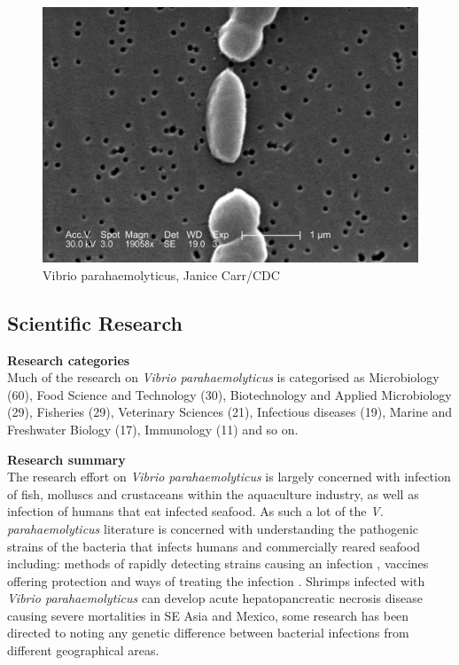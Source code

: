 \documentclass[]{book}
\theoremstyle{definition}
\theoremstyle{definition}
\theoremstyle{definition}
\theoremstyle{remark}
\begin{document}
\begin{figure}

{\centering \includegraphics[width=39.38in]{images_species/Vibrio_parahaemolyticus_01} 

}

\caption{Vibrio parahaemolyticus, Janice Carr/CDC}\label{fig:unnamed-chunk-10}
\end{figure}

\hypertarget{scientific-research-9}{%
\subsection{Scientific Research}\label{scientific-research-9}}

\textbf{Research categories}\\
Much of the research on \emph{Vibrio parahaemolyticus} is categorised as
Microbiology (60), Food Science and Technology (30), Biotechnology and
Applied Microbiology (29), Fisheries (29), Veterinary Sciences (21),
Infectious diseases (19), Marine and Freshwater Biology (17), Immunology
(11) and so on.

\textbf{Research summary}\\
The research effort on \emph{Vibrio parahaemolyticus} is largely
concerned with infection of fish, molluscs and crustaceans within the
aquaculture industry, as well as infection of humans that eat infected
seafood. As such a lot of the \emph{V. parahaemolyticus} literature is
concerned with understanding the pathogenic strains of the bacteria that
infects humans and commercially reared seafood including: methods of
rapidly detecting strains causing an infection , vaccines offering
protection and ways of treating the infection
\citep{RAHMAN_2006, Hu_2011}. Shrimps infected with \emph{Vibrio
parahaemolyticus} can develop acute hepatopancreatic necrosis disease
causing severe mortalities in SE Asia and Mexico, some research has been
directed to noting any genetic difference between bacterial infections
from different geographical areas.
\end{document}
